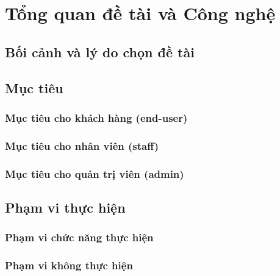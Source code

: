 \chapter{Tổng quan đề tài và Công nghệ}
\label{chuong:tong_quan}


\section{Bối cảnh và lý do chọn đề tài}
\label{sec:boi_canh}


\section{Mục tiêu}
\label{sec:muc_tieu}

\subsection{Mục tiêu cho khách hàng (end-user)}

\subsection{Mục tiêu cho nhân viên (staff)}

\subsection{Mục tiêu cho quản trị viên (admin)}

\section{Phạm vi thực hiện}
\label{sec:pham_vi}

\subsection{Phạm vi chức năng thực hiện}

\subsection{Phạm vi không thực hiện}

